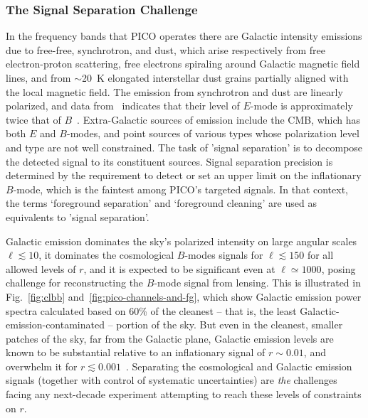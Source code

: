 \documentclass[PICOReport.tex]{subfiles}
\begin{document}

\subsubsection{The Signal Separation Challenge}
\label{sec:separation_challenge}

In the frequency bands that PICO operates there are Galactic intensity emissions due to free-free, synchrotron, and dust, which arise respectively from free electron-proton scattering, free electrons spiraling around Galactic magnetic field lines, and from $\sim$20~K elongated interstellar dust grains partially aligned with the local magnetic field. The emission from synchrotron and dust are linearly polarized, and data from \planck\ indicates that their level of $E$-mode is approximately twice that of $B$~\cite{planckEB}. Extra-Galactic sources of emission include the CMB, which has both $E$ and $B$-modes, and point sources of various types whose polarization level and type are not well constrained. The task of 'signal separation' is to decompose the detected signal to its constituent sources. Signal separation precision is determined by the requirement to detect or set an upper limit on the inflationary $B$-mode, which is the faintest among PICO's targeted signals. In that context, the terms `foreground separation' and `foreground cleaning' are used as equivalents to 'signal separation'. 

Galactic emission dominates the sky's polarized intensity on large angular scales $\ell \lesssim 10$, it dominates the cosmological $B$-modes signals for $\ell \lesssim 150$ for all allowed levels of $r$, and it is expected to be significant even at $\ell \simeq 1000$, posing challenge for reconstructing the $B$-mode signal from lensing. This is illustrated in Fig.~\ref{fig:clbb} and~\ref{fig:pico-channels-and-fg}, which show Galactic emission power spectra calculated based on 60\% of the cleanest -- that is, the least Galactic-emission-contaminated -- portion of the sky. But even in the cleanest, smaller patches of the sky, far from the Galactic plane, Galactic emission levels are known to be substantial relative to an inflationary signal of $r \sim 0.01$, and overwhelm it for $r \lesssim0.001$~\cite{planckEB}. Separating the cosmological and Galactic emission signals (together with control of systematic uncertainties) are {\it the} challenges facing any next-decade experiment attempting to reach these levels of constraints on $r$.
\end{document}
